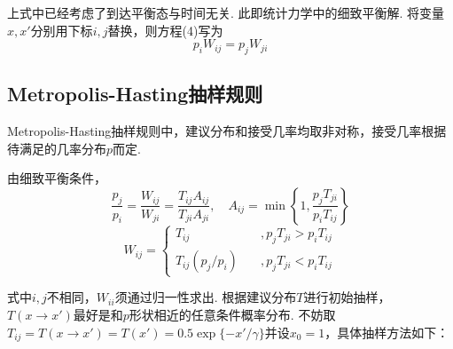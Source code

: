 \documentclass[12pt,a4paper,utf8]{ctexart}
\begin{document}
上式中已经考虑了到达平衡态与时间无关. 此即统计力学中的细致平衡解.
将变量$x,x'$分别用下标$i,j$替换，则方程(4)写为
\begin{equation}
    p_iW_{ij}=p_jW_{ji}
\end{equation}
\subsection{Metropolis-Hasting抽样规则}

Metropolis-Hasting抽样规则中，建议分布和接受几率均取非对称，接受几率根据
待满足的几率分布$p$而定. 

由细致平衡条件，
\begin{equation}
    \frac{p_j}{p_i} = \frac{W_{ij}}{W_{ji}} =
    \frac{T_{ij}A_{ij}}{T_{ji}A_{ji}},\quad A_{ij}= \min \left\{1,
    \frac{p_jT_{ji}}{p_iT_{ij}}\right\}
\end{equation}
\begin{equation}
    W_{ij} = 
    \begin{cases}
        T_{ij}\qquad  &,p_jT_{ji}>p_iT_{ij} \\
        T_{ij}(p_j/p_i)\quad  &,p_jT_{ji}<p_iT_{ij}
    \end{cases}
\end{equation}

式中$i,j$不相同，$W_{ii}$须通过归一性求出. 根据建议分布$T$进行初始抽样，
$T(x\rightarrow x')$最好是和$p$形状相近的任意条件概率分布. 不妨取$T_{ij} =
T(x\rightarrow x')=T(x')=0.5\exp\{-x'/\gamma\}$并设$x_0=1$，具体抽样方法如下：
\end{document}

